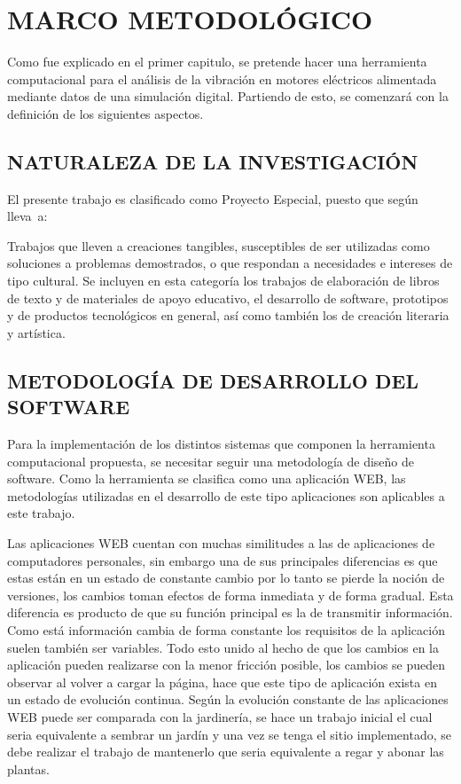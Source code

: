 \thispagestyle{empty}

\section{MARCO METODOLÓGICO}

Como fue explicado en el primer capitulo, se pretende hacer una herramienta
computacional para el análisis de la vibración en motores eléctricos alimentada
mediante datos de una simulación digital. Partiendo de esto, se comenzará
con la definición de los siguientes aspectos.

\subsection{NATURALEZA DE LA INVESTIGACIÓN}

El presente trabajo es clasificado como Proyecto Especial, puesto que según
\textcite{Hernandez} lleva~a:

\begin{center}
    \parbox[ht]{13.5 cm}{Trabajos que lleven a creaciones tangibles,
    susceptibles de ser utilizadas como soluciones a problemas demostrados, o
    que respondan a necesidades e intereses de tipo cultural. Se incluyen en
    esta categoría los trabajos de elaboración de libros de texto y de
    materiales de apoyo educativo, el desarrollo de software, prototipos y de
    productos tecnológicos en general, así como también los de creación
    literaria y artística.}
\end{center}

\subsection*{METODOLOGÍA DE DESARROLLO DEL SOFTWARE}

Para la implementación de los distintos sistemas que componen la herramienta
computacional propuesta, se necesitar seguir una metodología de diseño de
software. Como la herramienta se clasifica como una aplicación WEB, las
metodologías utilizadas en el desarrollo de este tipo aplicaciones son
aplicables a este trabajo.

Las aplicaciones WEB cuentan con muchas similitudes a las de aplicaciones de
computadores personales, sin embargo una de sus principales diferencias es que
estas están en un estado de constante cambio por lo tanto
se pierde la noción de versiones, los cambios toman efectos de forma inmediata
y de forma gradual. Esta diferencia es producto de que su función principal es
la de transmitir información. Como está información cambia de forma constante
los requisitos de la aplicación suelen también ser variables. Todo esto unido
al hecho de que los cambios en la aplicación pueden realizarse con la
menor fricción posible, los cambios se pueden observar al volver a cargar la
página, hace que este tipo de aplicación  exista en un estado de evolución
continua. Según \cite{pressman2002} la evolución constante de las aplicaciones
WEB puede ser comparada con la jardinería, se hace un trabajo inicial el cual
seria equivalente a sembrar un jardín y una vez se tenga el sitio implementado,
se debe realizar el trabajo de mantenerlo que seria equivalente a regar y
abonar las plantas.

